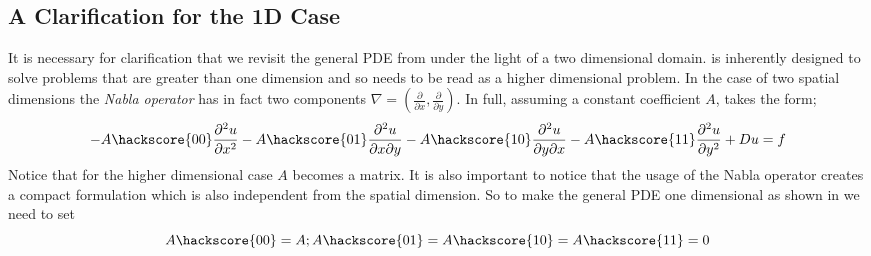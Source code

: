 \subsection{A Clarification for the 1D Case}
It is necessary for clarification that we revisit the general PDE from  under the light of a two dimensional domain. \esc is inherently designed to solve problems that are greater than one dimension and so  needs to be read as a higher dimensional problem. In the case of two spatial dimensions the \textit{Nabla operator} has in fact two components $\nabla = (\frac{\partial}{\partial x}, \frac{\partial}{\partial y})$. In full,  assuming a constant coefficient $A$, takes the form;
\begin{equation}\label{eqn:commonform2D}
-A\hackscore{00}\frac{\partial^{2}u}{\partial x^{2}} 
-A\hackscore{01}\frac{\partial^{2}u}{\partial x\partial y} 
-A\hackscore{10}\frac{\partial^{2}u}{\partial y\partial x} 
-A\hackscore{11}\frac{\partial^{2}u}{\partial y^{2}} 
+ Du = f
\end{equation}
Notice that for the higher dimensional case $A$ becomes a matrix. It is also
important to notice that the usage of the Nabla operator creates
a compact formulation which is also independent from the spatial dimension. 
So to make the general PDE  one dimensional as
shown in  we need to set
\begin{equation}
A\hackscore{00}=A; A\hackscore{01}=A\hackscore{10}=A\hackscore{11}=0
\end{equation}


